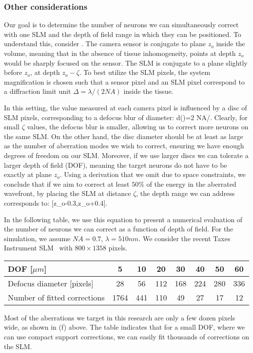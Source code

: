 
\subsubsection{Other considerations}\label{sec:otherconsiderations}
Our goal is to determine the number of neurons we can simultaneously correct with one SLM and the depth of field range in which they can be positioned. To understand this, consider . The camera sensor is conjugate to plane $z_o$ inside the volume, meaning that in the absence of tissue inhomogeneity, points at depth $z_o$ would be sharply focused on the sensor. The SLM is conjugate to a plane slightly before  $z_o$, at depth $z_o-\zeta$. 
To best utilize the SLM pixels, the system magnification is chosen such that a sensor pixel and an SLM pixel correspond to a diffraction limit unit  $\Delta=\lambda/(2NA)$ inside the tissue.
 
 In this setting, the value measured at each camera pixel is influenced by a disc of SLM pixels, corresponding to a defocus blur of diameter:
 \BE
 d(\zeta)=2 NA\cdot \zeta/\Delta.
 \EE  
 Clearly, for small  $\zeta$ values, the defocus blur is smaller, allowing us to  correct more neurons on the same SLM. On the other hand, the disc diameter should be at least as large as the number of aberration modes we wish to correct, ensuring we have enough degrees of freedom on our SLM. Moreover, if we use larger discs we can   tolerate a larger depth of field (DOF), meaning the target neurons do not have to be exactly at plane  $z_o$.
 Using a derivation that we omit due to space constraints, we conclude that if we aim to correct at least $50\%$ of the energy in the aberrated wavefront, by placing the SLM at distance $\zeta$, the depth range we can address corresponds to:
 \BE \label{eq:dof-slm-d} [z_o-0.3\zeta,z_o+0.4\zeta].\EE
 
 In the following table, we use this equation to present a numerical evaluation of the number of neurons we can correct as a function of depth of field. For the simulation, we assume 
  $NA=0.7$, $\lambda=510 nm$. %
We consider the recent Taxes Instrument SLM~\cite{PLM-TI_2019} with $800\times 1358$ pixels. 
\begin{center}
\begin{tabular}{|l|c|c|c|c|c|c|c|}
	\hline
	DOF [$\mu m$]&5&10&20&30&40&50&60\\\hline
	Defocus diameter [pixels]&28&56&112&   168 &  224&   280&   336\\
	Number of fitted corrections&1764 &        441 &        110  &        49 &         27 &         17  &        12 \\\hline
\end{tabular}
\end{center}
Most of the aberrations we target in this research are only a few dozen pixels wide, as shown in (f) above. The table indicates that for a small DOF, where we can use compact support corrections, we can easily fit thousands of corrections on the SLM.

